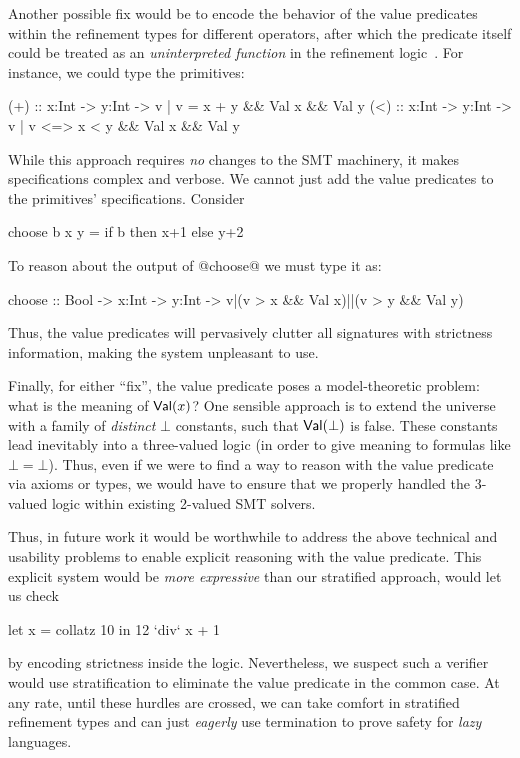 %
Another possible fix would be to encode the behavior of the
value predicates within the refinement types for different 
operators, after which the predicate itself could be treated 
as an \emph{uninterpreted function} in the refinement 
logic~\cite{bradleybook}. For instance, we could type 
the primitives:
%
\begin{code}
 (+) :: x:Int -> y:Int -> {v | v  =  x + y && Val x && Val y}
 (<) :: x:Int -> y:Int -> {v | v <=> x < y && Val x && Val y}
\end{code}
%
While this approach requires \emph{no} changes to the SMT 
machinery, it makes specifications complex and verbose. 
%
%
We cannot just add the value predicates to the primitives' 
specifications. Consider 
%
\begin{code}
 choose b x y = if b then x+1 else y+2
\end{code}
%
To reason about the output of @choose@ we must type it as:
%
\begin{code}
 choose :: Bool -> x:Int -> y:Int 
        -> {v|(v > x && Val x)||(v > y && Val y)}  
\end{code}
%
Thus, the value predicates will pervasively clutter all 
signatures with strictness information, making the system 
unpleasant to use.


Finally, for either ``fix'', the value predicate poses a 
model-theoretic problem: 
what is the meaning of $\mathsf{Val}(x)$? 
%
One sensible approach is to extend the universe with a family of 
\emph{distinct} $\bot$ constants, such that $\mathsf{Val}(\bot)$ is false.
%
These constants lead inevitably into a three-valued logic 
(in order to give meaning to formulas like $\bot = \bot$).
%
Thus, even if we were to find a way to reason with the value 
predicate via axioms or types, we would have to ensure that 
we properly handled the 3-valued logic within 
existing 2-valued SMT solvers.

Thus, in future work it would be worthwhile to address the above 
technical and usability problems to enable explicit reasoning with 
the value predicate.
%
This explicit system would be \emph{more expressive} than our 
stratified approach, \eg would let us check 
%
\begin{code}
  let x = collatz 10 in 12 `div` x + 1
\end{code}
%
by encoding strictness inside the logic. Nevertheless, we suspect
such a verifier would use stratification to eliminate the value
predicate in the common case.
%
At any rate, until these hurdles are crossed, we can take comfort in
stratified refinement types and can just \emph{eagerly}
use termination to prove safety for \emph{lazy} languages.

